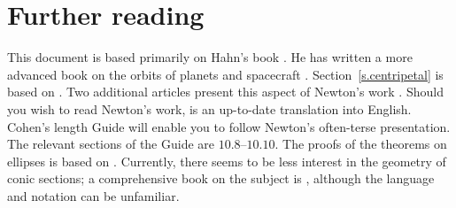 
\section*{Further reading}

This document is based primarily on Hahn's book \cite{hahn-cic}. He has written a more advanced book on the orbits of planets and spacecraft \cite{hahn-orbits}. Section~\ref{s.centripetal} is based on \cite{griffiths}. Two additional articles present this aspect of Newton's work \cite{hauser-lang,stein}. Should you wish to read Newton's work, \cite{newton-cohen} is an up-to-date translation into English. Cohen's length Guide will enable you to follow Newton's often-terse presentation. The relevant sections of the Guide are $10.8$--$10.10$. The proofs of the theorems on ellipses is based on \cite{wiki-ellipse}. Currently, there seems to be less interest in the geometry of conic sections; a comprehensive book on the subject is \cite{besant}, although the language and notation can be unfamiliar.




